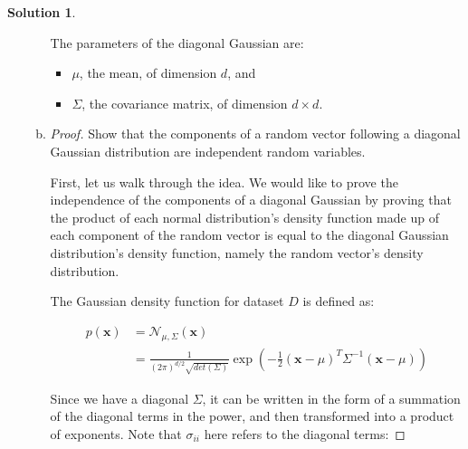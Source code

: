 \documentclass[letterpaper, 12pt]{article}
\theoremstyle{definition}
\newtheorem*{solution}{Solution}
\begin{document}
\begin{solution}
\begin{enumerate}[1.]
\begin{enumerate}[(a)]
                
                    
                    The parameters of the diagonal Gaussian are:
                    \begin{itemize}
                    	\item $\mu$, the mean, of dimension $d$, and
                        \item $\Sigma$, the covariance matrix, of dimension $d \times d$.
                    \end{itemize}
                    
            	\item 
                	\begin{proof}
                    	Show that the components of a random vector following a diagonal Gaussian distribution are independent random variables.
                        
                        First, let us walk through the idea. We would like to prove the independence of the components of a diagonal Gaussian by proving that the product of each normal distribution's density function made up of each component of the random vector is equal to the diagonal Gaussian distribution's density function, namely the random vector's density distribution.
                        
                        The Gaussian density function for dataset $D$ is defined as:
                        
                        \begin{equation*}
							\begin{split}
								p(\bm{x}) & = \mathcal{N}_{\mu, \Sigma}(\bm{x})\\
                                & = \frac{1}{(2\pi)^{d/2}\sqrt{det(\Sigma)}} \exp(-\frac{1}{2}(\bm{x} - \mu)^T \Sigma^{-1} (\bm{x} - \mu))
                            \end{split}
						\end{equation*}
                        
                        Since we have a diagonal $\Sigma$, it can be written in the form of a summation of the diagonal terms in the power, and then transformed into a product of exponents. Note that $\sigma_{ii}$ here refers to the diagonal terms:
                        

\end{proof}
\end{enumerate}
\end{enumerate}
\end{solution}
\end{document}
